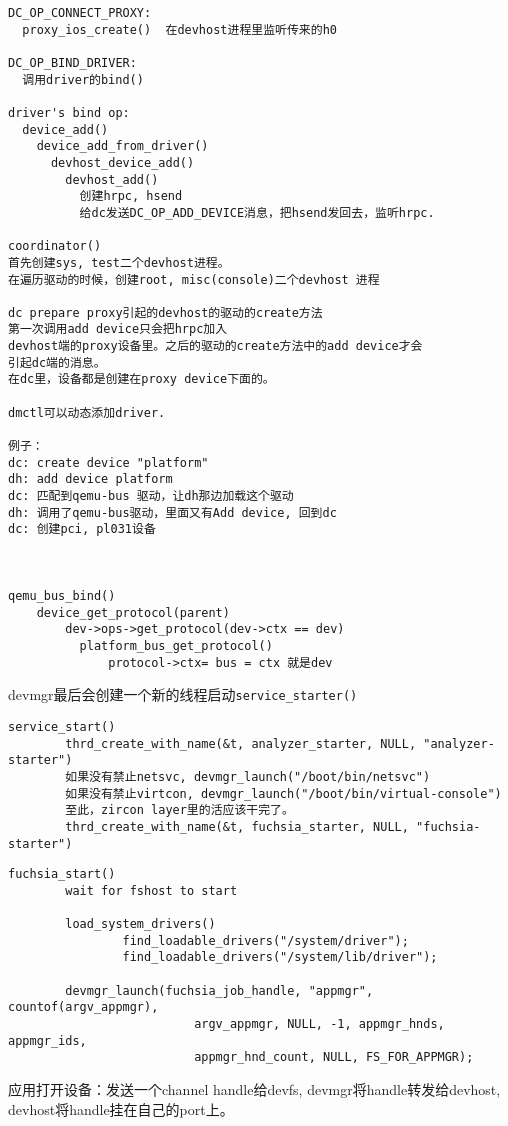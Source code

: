\begin{verbatim}
DC_OP_CONNECT_PROXY:
  proxy_ios_create()  在devhost进程里监听传来的h0

DC_OP_BIND_DRIVER:
  调用driver的bind()

driver's bind op:
  device_add()
    device_add_from_driver()
      devhost_device_add()
        devhost_add()
          创建hrpc, hsend
          给dc发送DC_OP_ADD_DEVICE消息，把hsend发回去，监听hrpc.

coordinator()
首先创建sys, test二个devhost进程。
在遍历驱动的时候，创建root, misc(console)二个devhost 进程

dc prepare proxy引起的devhost的驱动的create方法
第一次调用add device只会把hrpc加入
devhost端的proxy设备里。之后的驱动的create方法中的add device才会
引起dc端的消息。
在dc里，设备都是创建在proxy device下面的。

dmctl可以动态添加driver.

例子：
dc: create device "platform"
dh: add device platform
dc: 匹配到qemu-bus 驱动，让dh那边加载这个驱动
dh: 调用了qemu-bus驱动，里面又有Add device, 回到dc
dc: 创建pci, pl031设备



qemu_bus_bind()
    device_get_protocol(parent)
        dev->ops->get_protocol(dev->ctx == dev)
          platform_bus_get_protocol()
              protocol->ctx= bus = ctx 就是dev
\end{verbatim}

devmgr最后会创建一个新的线程启动\verb|service_starter()|
\begin{verbatim}
service_start()
        thrd_create_with_name(&t, analyzer_starter, NULL, "analyzer-starter")
        如果没有禁止netsvc, devmgr_launch("/boot/bin/netsvc")
        如果没有禁止virtcon, devmgr_launch("/boot/bin/virtual-console")
        至此，zircon layer里的活应该干完了。
        thrd_create_with_name(&t, fuchsia_starter, NULL, "fuchsia-starter")
\end{verbatim}

\begin{verbatim}
fuchsia_start()
        wait for fshost to start
        
        load_system_drivers()
                find_loadable_drivers("/system/driver");
                find_loadable_drivers("/system/lib/driver");

        devmgr_launch(fuchsia_job_handle, "appmgr", countof(argv_appmgr),
                          argv_appmgr, NULL, -1, appmgr_hnds, appmgr_ids,
                          appmgr_hnd_count, NULL, FS_FOR_APPMGR);

\end{verbatim}

应用打开设备：发送一个channel handle给devfs, devmgr将handle转发给devhost, 
devhost将handle挂在自己的port上。
